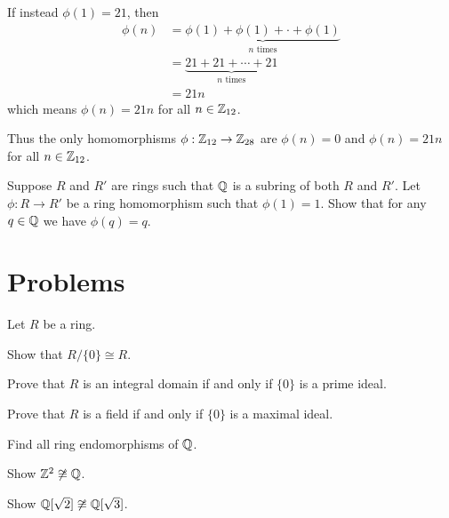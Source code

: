 \begin{example}
    If instead $\phi(1) = 21$, then
    \begin{align*}
        \phi(n) &= \underbrace{\phi(1) + \phi(1) + \cdot + \phi(1)}_{n \text{ times}}\\
        &= \underbrace{21 + 21 + \cdots + 21}_{n \text{ times}}\\
        &= 21n
    \end{align*}
    which means $\phi(n) = 21n$ for all $n \in \mathbb{Z}_{12}$.

    Thus the only homomorphisms $\phi: \mathbb{Z}_{12} \to \mathbb{Z}_{28}$ are $\phi(n) = 0$ and $\phi(n) = 21n$ for all $n \in \mathbb{Z}_{12}$.
\end{example}

\begin{exercise}\label{exercise-homomorphism-over-Q-fixes-elements-of-Q}
    Suppose $R$ and $R'$ are rings such that $\mathbb{Q}$ is a subring of both $R$ and $R'$. Let $\phi: R \to R'$ be a ring homomorphism such that $\phi(1) = 1$. Show that for any $q \in \mathbb{Q}$ we have $\phi(q) = q$.
\end{exercise}



\section{Problems}
\begin{problem}\label{problem-integral-domain-iff-trivial-ideal-is-prime}
    Let $R$ be a ring.
    \begin{partquestions}{\roman*}
        \item Show that $R/\{0\} \cong R$.
        \item Prove that $R$ is an integral domain if and only if $\{0\}$ is a prime ideal.
        \item Prove that $R$ is a field if and only if $\{0\}$ is a maximal ideal.
    \end{partquestions}
\end{problem}

\begin{problem}
    Find all ring endomorphisms of $\mathbb{Q}$.
\end{problem}

\begin{problem}
    Show $\mathbb{Z}^2 \not\cong \mathbb{Q}$.
\end{problem}

\begin{problem}
    Show $\mathbb{Q}[\sqrt2] \not\cong \mathbb{Q}[\sqrt3]$.
\end{problem}

